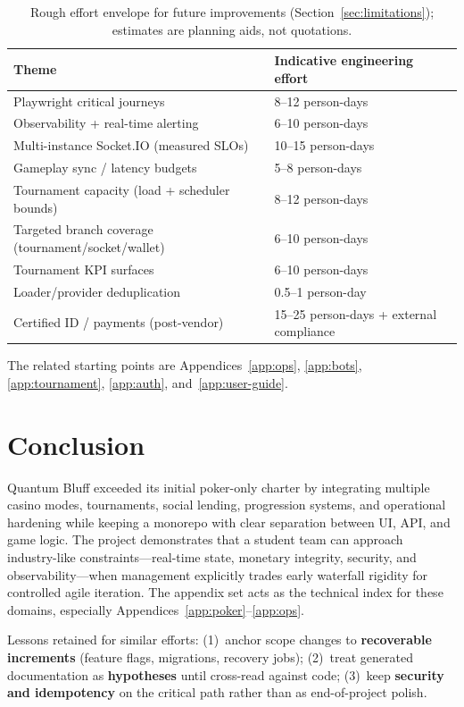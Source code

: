 \documentclass[11pt,a4paper]{article}
\begin{document}
\begin{table}[htbp]
\centering
\small
\begin{tabular}{@{}p{6.4cm}p{6.8cm}@{}}
\toprule
Theme & Indicative engineering effort \\
\midrule
Playwright critical journeys & 8--12 person-days \\
Observability + real-time alerting & 6--10 person-days \\
Multi-instance Socket.IO (measured SLOs) & 10--15 person-days \\
Gameplay sync / latency budgets & 5--8 person-days \\
Tournament capacity (load + scheduler bounds) & 8--12 person-days \\
Targeted branch coverage (tournament/socket/wallet) & 6--10 person-days \\
Tournament KPI surfaces & 6--10 person-days \\
Loader/provider deduplication & 0.5--1 person-day \\
Certified ID / payments (post-vendor) & 15--25 person-days + external compliance \\
\bottomrule
\end{tabular}
\caption{Rough effort envelope for future improvements (Section~\ref{sec:limitations}); estimates are planning aids, not quotations.}\label{tab:future-effort}
\end{table}

The related starting points are Appendices~\ref{app:ops}, \ref{app:bots}, \ref{app:tournament}, \ref{app:auth}, and~\ref{app:user-guide}.

\section{Conclusion}

Quantum Bluff exceeded its initial poker-only charter by integrating multiple casino modes, tournaments, social lending, progression systems, and operational hardening while keeping a monorepo with clear separation between UI, API, and game logic. The project demonstrates that a student team can approach industry-like constraints---real-time state, monetary integrity, security, and observability---when management explicitly trades early waterfall rigidity for controlled agile iteration. The appendix set acts as the technical index for these domains, especially Appendices~\ref{app:poker}--\ref{app:ops}.

Lessons retained for similar efforts: (1)~anchor scope changes to \textbf{recoverable increments} (feature flags, migrations, recovery jobs); (2)~treat generated documentation as \textbf{hypotheses} until cross-read against code; (3)~keep \textbf{security and idempotency} on the critical path rather than as end-of-project polish.
\end{document}
